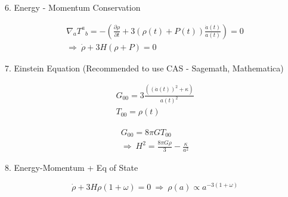 \documentclass[10pt]{article}
\begin{document}
\par\null

6. Energy - Momentum Conservation

\begin{equation}
\begin{gathered}
\nabla_a {T^a}_b= -\left(\frac{\partial \rho}{\partial t} + 3(\rho(t)+P(t))\frac{\dot{a}(t)}{a(t)} 
\right)= 0 \\
\Rightarrow ~ \dot{\rho} + 3H(\rho + P) = 0
\end{gathered}
\end{equation}

7. Einstein Equation (Recommended to use CAS - Sagemath, Mathematica)

\begin{equation}
\begin{gathered}
G_{00} = 3\frac{((\dot{a}(t))^2 + \kappa)}{a(t)^2} \\
T_{00} = \rho(t)
\end{gathered}
\end{equation}

\begin{equation}
\begin{gathered}
G_{00} = 8\pi GT_{00} \\
\Rightarrow ~ H^2 = \frac{8\pi G\rho}{3} - \frac{\kappa}{a^2} 
\end{gathered}
\end{equation}

8. Energy-Momentum + Eq of State

\begin{equation}
\dot{\rho} + 3H\rho(1+\omega) = 0 ~\Rightarrow~ \rho(a) \propto a^{-3(1+\omega)}
\end{equation}

\clearpage
\end{document}
